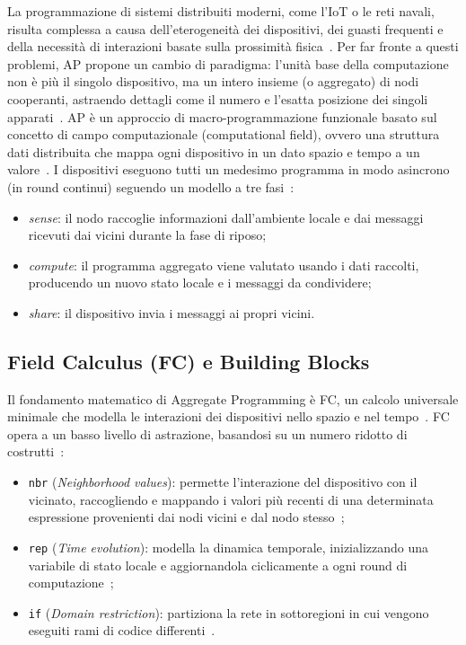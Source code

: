 La programmazione di sistemi distribuiti moderni, come l'\ac{IoT} o le reti navali, risulta complessa a causa dell'eterogeneità dei dispositivi, dei guasti frequenti e della necessità di interazioni basate sulla prossimità fisica~\cite{beal2015aggregate}. Per far fronte a questi problemi, \ac{AP} propone un cambio di paradigma: l'unità base della computazione non è più il singolo dispositivo, ma un intero insieme (o aggregato) di nodi cooperanti, astraendo dettagli come il numero e l'esatta posizione dei singoli apparati~\cite{beal2015aggregate, beal2016foundations}. 
\ac{AP} è un approccio di macro-programmazione funzionale basato sul concetto di campo computazionale (computational field), ovvero una struttura dati distribuita che mappa ogni dispositivo in un dato spazio e tempo a un valore~\cite{viroli2018engineering, 11217861}. I dispositivi eseguono tutti un medesimo programma in modo asincrono (in round continui) seguendo un modello a tre fasi~\cite{11217861}:
\begin{itemize} 
  \item \emph{sense}: il nodo raccoglie informazioni dall'ambiente locale e dai messaggi ricevuti dai vicini durante la fase di riposo;
  \item \emph{compute}: il programma aggregato viene valutato usando i dati raccolti, producendo un nuovo stato locale e i messaggi da condividere;
  \item \emph{share}: il dispositivo invia i messaggi ai propri vicini.
\end{itemize}

\subsection{Field Calculus (FC) e Building Blocks}
\label{sec:fc}

Il fondamento matematico di Aggregate Programming è \ac{FC}, un calcolo universale minimale che modella le interazioni dei dispositivi nello spazio e nel tempo~\cite{beal2016foundations, viroli2018engineering}. FC opera a un basso livello di astrazione, basandosi su un numero ridotto di costrutti~\cite{viroli2018engineering}:
\begin{itemize}
    \item \texttt{nbr} (\emph{Neighborhood values}): permette l'interazione del dispositivo con il vicinato, raccogliendo e mappando i valori più recenti di una determinata espressione provenienti dai nodi vicini e dal nodo stesso~\cite{viroli2018engineering, beal2014building};
    \item \texttt{rep} (\emph{Time evolution}): modella la dinamica temporale, inizializzando una variabile di stato locale e aggiornandola ciclicamente a ogni round di computazione~\cite{viroli2018engineering, beal2014building};
    \item \texttt{if} (\emph{Domain restriction}): partiziona la rete in sottoregioni in cui vengono eseguiti rami di codice differenti~\cite{viroli2018engineering}.
\end{itemize}
 
